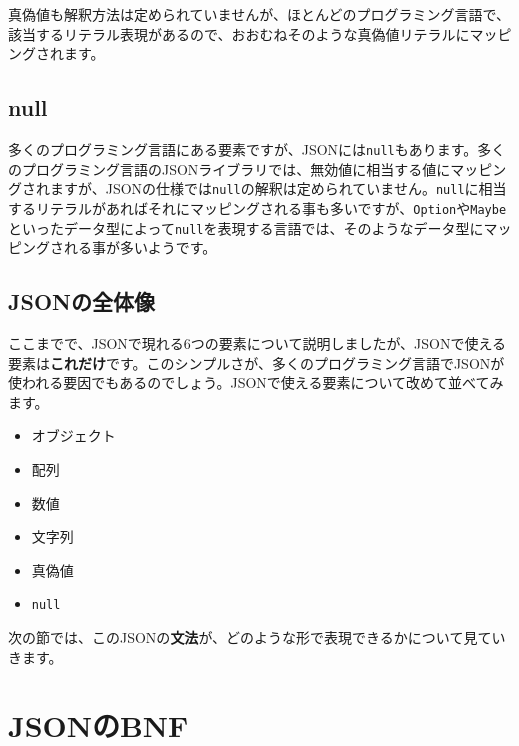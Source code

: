 \begin{Shaded}
\begin{Highlighting}[]
\end{Highlighting}
\end{Shaded}

真偽値も解釈方法は定められていませんが、ほとんどのプログラミング言語で、該当するリテラル表現があるので、おおむねそのような真偽値リテラルにマッピングされます。

\hypertarget{chapter3-null}{%
\subsection{null}\label{chapter3-null}}

多くのプログラミング言語にある要素ですが、JSONには\texttt{null}もあります。多くのプログラミング言語のJSONライブラリでは、無効値に相当する値にマッピングされますが、JSONの仕様では\texttt{null}の解釈は定められていません。\texttt{null}に相当するリテラルがあればそれにマッピングされる事も多いですが、\texttt{Option}や\texttt{Maybe}といったデータ型によって\texttt{null}を表現する言語では、そのようなデータ型にマッピングされる事が多いようです。

\hypertarget{chapter3-jsonux306eux5168ux4f53ux50cf}{%
\subsection{JSONの全体像}\label{chapter3-jsonux306eux5168ux4f53ux50cf}}

ここまでで、JSONで現れる6つの要素について説明しましたが、JSONで使える要素は\textbf{これだけ}です。このシンプルさが、多くのプログラミング言語でJSONが使われる要因でもあるのでしょう。JSONで使える要素について改めて並べてみます。

\begin{itemize}
\tightlist
\item
  オブジェクト
\item
  配列
\item
  数値
\item
  文字列
\item
  真偽値
\item
  \texttt{null}
\end{itemize}

次の節では、このJSONの\textbf{文法}が、どのような形で表現できるかについて見ていきます。

\hypertarget{chapter3-jsonux306ebnf}{%
\section{JSONのBNF}\label{chapter3-jsonux306ebnf}}

